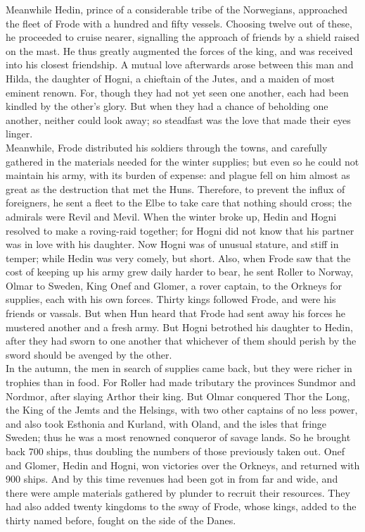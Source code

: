 \documentclass[10pt,a4paper]{report}
\begin{document}
Meanwhile Hedin, prince of a considerable tribe of the Norwegians, approached the fleet of Frode with a hundred and fifty vessels. Choosing twelve out of these, he proceeded to cruise nearer, signalling the approach of friends by a shield raised on the mast. He thus greatly augmented the forces of the king, and was received into his closest friendship. A mutual love afterwards arose between this man and Hilda, the daughter of Hogni, a chieftain of the Jutes, and a maiden of most eminent renown. For, though they had not yet seen one another, each had been kindled by the other's glory. But when they had a chance of beholding one another, neither could look away; so steadfast was the love that made their eyes linger.\\

Meanwhile, Frode distributed his soldiers through the towns, and carefully gathered in the materials needed for the winter supplies; but even so he could not maintain his army, with its burden of expense: and plague fell on him almost as great as the destruction that met the Huns. Therefore, to prevent the influx of foreigners, he sent a fleet to the Elbe to take care that nothing should cross; the admirals were Revil and Mevil. When the winter broke up, Hedin and Hogni resolved to make a roving-raid together; for Hogni did not know that his partner was in love with his daughter. Now Hogni was of unusual stature, and stiff in temper; while Hedin was very comely, but short. Also, when Frode saw that the cost of keeping up his army grew daily harder to bear, he sent Roller to Norway, Olmar to Sweden, King Onef and Glomer, a rover captain, to the Orkneys for supplies, each with his own forces. Thirty kings followed Frode, and were his friends or vassals. But when Hun heard that Frode had sent away his forces he mustered another and a fresh army. But Hogni betrothed his daughter to Hedin, after they had sworn to one another that whichever of them should perish by the sword should be avenged by the other.\\

In the autumn, the men in search of supplies came back, but they were richer in trophies than in food. For Roller had made tributary the provinces Sundmor and Nordmor, after slaying Arthor their king. But Olmar conquered Thor the Long, the King of the Jemts and the Helsings, with two other captains of no less power, and also took Esthonia and Kurland, with Oland, and the isles that fringe Sweden; thus he was a most renowned conqueror of savage lands. So he brought back 700 ships, thus doubling the numbers of those previously taken out. Onef and Glomer, Hedin and Hogni, won victories over the Orkneys, and returned with 900 ships. And by this time revenues had been got in from far and wide, and there were ample materials gathered by plunder to recruit their resources. They had also added twenty kingdoms to the sway of Frode, whose kings, added to the thirty named before, fought on the side of the Danes.\\
\end{document}
